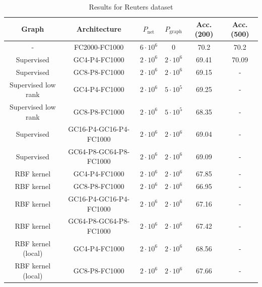 \begin{table}[H]
\caption{Results for Reuters dataset}
\begin{center}
\begin{tabular}{|c|c|c|c|c|c|}
\hline
Graph & Architecture & $P_\text{net}$ & $P_\text{graph}$ & Acc. (200) & Acc. (500)\\
\hline
- &FC2000-FC1000 & $6 \cdot 10^6$ & 0 &70.2 & 70.2 \\
Supervised & GC4-P4-FC1000 & $2\cdot 10^6$ & $2 \cdot 10^6$ & 69.41 & 70.09 \\
Supervised & GC8-P8-FC1000 & $2 \cdot 10^6$ & $2 \cdot 10^6$ & 69.15 & - \\
Supervised low rank & GC4-P4-FC1000 & $2\cdot 10^6$ & $5 \cdot 10^5$ & 69.25 & - \\
Supervised low rank & GC8-P8-FC1000 & $2 \cdot 10^6$ & $5 \cdot 10^5$ & 68.35 & - \\
Supervised & GC16-P4-GC16-P4-FC1000& $2 \cdot 10^6$ & $2 \cdot 10^6$ & 69.04 & - \\
Supervised &GC64-P8-GC64-P8-FC1000 & $2 \cdot 10^6$ & $2 \cdot 10^6$ & 69.09 & - \\
RBF kernel & GC4-P4-FC1000 & $2\cdot 10^6$ & $2 \cdot 10^6$ & 67.85 & - \\
RBF kernel & GC8-P8-FC1000 & $2 \cdot 10^6$ & $2 \cdot 10^6$ & 66.95 & - \\
RBF kernel & GC16-P4-GC16-P4-FC1000 & $2 \cdot 10^6$ & $2 \cdot 10^6$ & 67.16 & - \\
RBF kernel & GC64-P8-GC64-P8-FC1000 & $2 \cdot 10^6$ & $2 \cdot 10^6$ & 67.42 & - \\
RBF kernel (local)& GC4-P4-FC1000 & $2\cdot 10^6$ & $2 \cdot 10^6$ & 68.56 & - \\
RBF kernel (local) & GC8-P8-FC1000 & $2 \cdot 10^6$ & $2 \cdot 10^6$ & 67.66 & - \\
\hline
\end{tabular}
\end{center}
\label{reuterstable}
\end{table}


